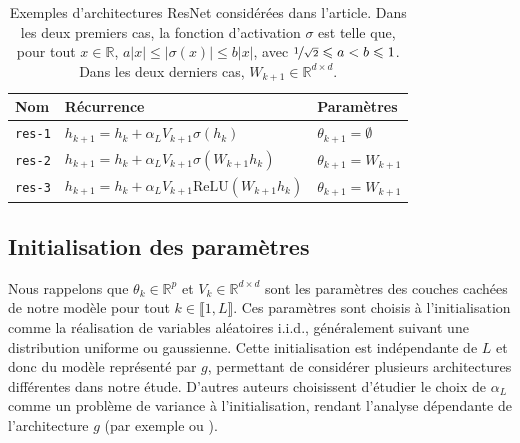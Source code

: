 \begin{table}[H]
    \centering
    \begin{tabular}{lll}
        \hline
        \textbf{Nom} & \textbf{Récurrence} & \textbf{Paramètres} \\ \hline
        \texttt{res-1} & \( h_{k+1} = h_k + \alpha_L V_{k+1}\sigma(h_k) \) & \( \theta_{k+1} = \emptyset \) \\
        \texttt{res-2} & \( h_{k+1} = h_k + \alpha_L V_{k+1}\sigma(W_{k+1}h_k) \) & \( \theta_{k+1} = W_{k+1} \) \\
        \texttt{res-3} & \( h_{k+1} = h_k + \alpha_L V_{k+1}\text{ReLU}(W_{k+1}h_k) \) & \( \theta_{k+1} = W_{k+1} \) \\ \hline
    \end{tabular}
    \caption{Exemples d'architectures ResNet considérées dans l'article. Dans les deux premiers cas, la fonction d'activation \( \sigma \) est telle que, pour tout \( x \in \mathbb{R} \), \( a|x| \leqslant |\sigma(x)| \leqslant b|x| \), avec \( \nicefrac{1}{\sqrt{2}} \leqslant a < b \leqslant 1 \). Dans les deux derniers cas, \( W_{k+1} \in \mathbb{R}^{d \times d} \).}
    \label{tab:resnetArchitectures}
\end{table}

\subsection*{Initialisation des paramètres}
Nous rappelons que $\theta_k \in \mathbb{R}^p$ et $V_k \in \mathbb{R}^{d \times d}$ sont les paramètres des couches cachées de notre modèle pour tout $k \in \llbracket 1, L \rrbracket$. Ces paramètres sont choisis à l'initialisation comme la réalisation de variables aléatoires i.i.d., généralement suivant une distribution uniforme ou gaussienne. Cette initialisation est indépendante de $L$ et donc du modèle représenté par $g$, permettant de considérer plusieurs architectures différentes dans notre étude. D'autres auteurs choisissent d'étudier le choix de $\alpha_L$ comme un problème de variance à l'initialisation, rendant l'analyse dépendante de l'architecture $ g $ (par exemple \cite{Yang2017MeanFR} ou \cite{wang2022deepnet}).

